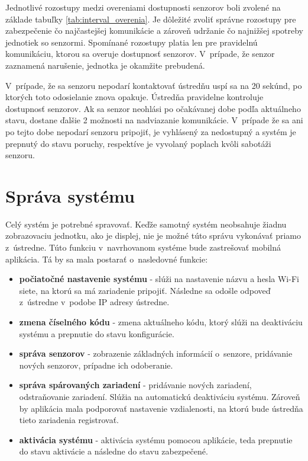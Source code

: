 Jednotlivé rozostupy medzi overeniami dostupnosti senzorov boli zvolené na základe tabuľky \ref{tab:interval_overenia}. Je dôležité zvoliť správne rozostupy pre zabezpečenie čo najčastejšej komunikácie a zároveň udržanie čo najnižšej spotreby jednotiek so senzormi. Spomínané rozostupy platia len pre pravidelnú komunikáciu, ktorou sa overuje dostupnosť senzorov. V~prípade, že senzor zaznamená narušenie, jednotka je okamžite prebudená.

V~prípade, že sa senzoru nepodarí kontaktovať ústredňu uspí sa na 20 sekúnd, po ktorých toto odosielanie znova opakuje. Ústredňa pravidelne kontroluje dostupnosť senzorov. Ak sa senzor neohlási po očakávanej dobe podľa aktuálneho stavu, dostane ďalšie 2 možnosti na nadviazanie komunikácie. V~prípade že sa ani po tejto dobe nepodarí senzoru pripojiť, je vyhlásený za nedostupný a systém je prepnutý do stavu poruchy, respektíve je vyvolaný poplach kvôli sabotáži senzoru.

\section{Správa systému}

Celý systém je potrebné spravovať. Keďže samotný systém neobsahuje žiadnu zobrazovaciu jednotku, ako je displej, nie je možné túto správu vykonávať priamo z~ústredne. Túto funkciu v~navrhovanom systéme bude zastrešovať mobilná aplikácia. Tá by sa mala postarať o~nasledovné funkcie:
\begin{itemize}
    \item \textbf{počiatočné nastavenie systému} - slúži na nastavenie názvu a hesla Wi-Fi siete, na ktorú sa má zariadenie pripojiť. Následne sa odošle odpoveď z~ústredne v~podobe IP adresy ústredne.
    \item \textbf{zmena číselného kódu} - zmena aktuálneho kódu, ktorý slúži na deaktiváciu systému a prepnutie do stavu konfigurácie.
    \item \textbf{správa senzorov} - zobrazenie základných informácií o~senzore, pridávanie nových senzorov, prípadne ich odoberanie.
    \item \textbf{správa spárovaných zariadení} - pridávanie nových zariadení, odstraňovanie zariadení. Slúžia na automatickú deaktiváciu systému. Zároveň by aplikácia mala podporovať nastavenie vzdialenosti, na ktorú bude ústredňa tieto zariadenia registrovať.
    \item \textbf{aktivácia systému} - aktivácia systému pomocou aplikácie, teda prepnutie do stavu aktivácie a následne do stavu zabezpečené.
\end{itemize}

